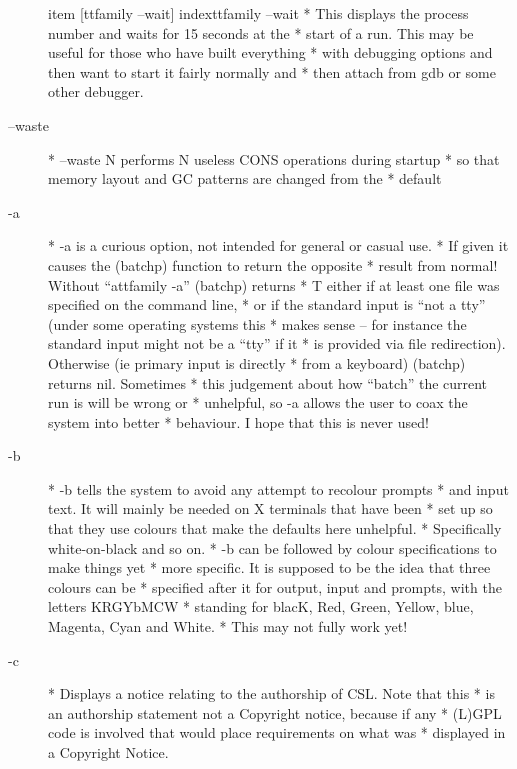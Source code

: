 \documentclass[a4paper,11pt]{article}
\begin{document}
\begin{description}
item [{ttfamily --wait}] index{{ttfamily --wait}}
          * This displays the process number and waits for 15 seconds at the
          * start of a run. This may be useful for those who have built everything
          * with debugging options and then want to start it fairly normally and
          * then attach from gdb or some other debugger.

\item [{\ttfamily --waste}] 
          * --waste N performs N useless CONS operations during startup
          * so that memory layout and GC patterns are changed from the
          * default

\item [{\ttfamily -a}] 
          * {\ttfamily -a} is a curious option, not intended for general or casual use.
          * If given it causes the {\ttfamily (batchp)} function to return the opposite
          * result from normal!  Without ``{attfamily -a}'' {\ttfamily (batchp)} returns
          * {\ttfamily T} either if at least one file was specified on the command line,
          * or if the standard input is ``not a tty'' (under some operating systems this
          * makes sense -- for instance the standard input might not be a ``tty'' if it
          * is provided via file redirection).  Otherwise (ie primary input is directly
          * from a keyboard) {\ttfamily (batchp)} returns {\ttfamily nil}.  Sometimes
          * this judgement about how ``batch'' the current run is will be wrong or
          * unhelpful, so {\ttfamily -a} allows the user to coax the system into better
          * behaviour.  I hope that this is never used!

\item [{\ttfamily -b}] 
          * {\ttfamily -b} tells the system to avoid any attempt to recolour prompts
          * and input text. It will mainly be needed on X terminals that have been
          * set up so that they use colours that make the defaults here unhelpful.
          * Specifically white-on-black and so on.
          * {\ttfamily -b} can be followed by colour specifications to make things yet
          * more specific. It is supposed to be the idea that three colours can be
          * specified after it for output, input and prompts, with the letters KRGYbMCW
          * standing for blacK, Red, Green, Yellow, blue, Magenta, Cyan and White.
          * This may not fully work yet!

\item [{\ttfamily -c}] 
          * Displays a notice relating to the authorship of CSL. Note that this
          * is an authorship statement not a Copyright notice, because if any
          * (L)GPL code is involved that would place requirements on what was
          * displayed in a Copyright Notice.


\end{description}
\end{document}

